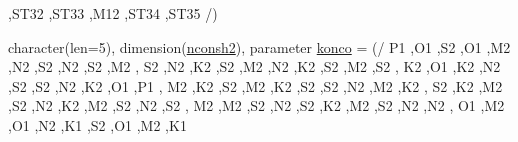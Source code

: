 \begin{DoxyCompactItemize}
\textquotesingle{},\textquotesingle{}\+S\+T32 \textquotesingle{},\textquotesingle{}\+S\+T33 \textquotesingle{},\textquotesingle{}\+M12 \textquotesingle{},\textquotesingle{}\+S\+T34 \textquotesingle{},\textquotesingle{}\+S\+T35 \textquotesingle{}/)
\item 
character(len=5), dimension(\mbox{\hyperlink{namespacemoduletoga_a839ff93f37eef8183b7f13edc4952154}{nconsh2}}), parameter \mbox{\hyperlink{namespacemoduletoga_aa6e7e4054f2ee5447ea73ce7fa1c250a}{konco}} = (/ \textquotesingle{}P1 \textquotesingle{},\textquotesingle{}O1 \textquotesingle{},\textquotesingle{}S2 \textquotesingle{},\textquotesingle{}O1 \textquotesingle{},\textquotesingle{}M2 \textquotesingle{},\textquotesingle{}N2 \textquotesingle{},\textquotesingle{}S2 \textquotesingle{},\textquotesingle{}N2 \textquotesingle{},\textquotesingle{}S2 \textquotesingle{},\textquotesingle{}M2 \textquotesingle{}, \textquotesingle{}S2 \textquotesingle{},\textquotesingle{}N2 \textquotesingle{},\textquotesingle{}K2 \textquotesingle{},\textquotesingle{}S2 \textquotesingle{},\textquotesingle{}M2 \textquotesingle{},\textquotesingle{}N2 \textquotesingle{},\textquotesingle{}K2 \textquotesingle{},\textquotesingle{}S2 \textquotesingle{},\textquotesingle{}M2 \textquotesingle{},\textquotesingle{}S2 \textquotesingle{}, \textquotesingle{}K2 \textquotesingle{},\textquotesingle{}O1 \textquotesingle{},\textquotesingle{}K2 \textquotesingle{},\textquotesingle{}N2 \textquotesingle{},\textquotesingle{}S2 \textquotesingle{},\textquotesingle{}S2 \textquotesingle{},\textquotesingle{}N2 \textquotesingle{},\textquotesingle{}K2 \textquotesingle{},\textquotesingle{}O1 \textquotesingle{},\textquotesingle{}P1 \textquotesingle{}, \textquotesingle{}M2 \textquotesingle{},\textquotesingle{}K2 \textquotesingle{},\textquotesingle{}S2 \textquotesingle{},\textquotesingle{}M2 \textquotesingle{},\textquotesingle{}K2 \textquotesingle{},\textquotesingle{}S2 \textquotesingle{},\textquotesingle{}S2 \textquotesingle{},\textquotesingle{}N2 \textquotesingle{},\textquotesingle{}M2 \textquotesingle{},\textquotesingle{}K2 \textquotesingle{}, \textquotesingle{}S2 \textquotesingle{},\textquotesingle{}K2 \textquotesingle{},\textquotesingle{}M2 \textquotesingle{},\textquotesingle{}S2 \textquotesingle{},\textquotesingle{}N2 \textquotesingle{},\textquotesingle{}K2 \textquotesingle{},\textquotesingle{}M2 \textquotesingle{},\textquotesingle{}S2 \textquotesingle{},\textquotesingle{}N2 \textquotesingle{},\textquotesingle{}S2 \textquotesingle{}, \textquotesingle{}M2 \textquotesingle{},\textquotesingle{}M2 \textquotesingle{},\textquotesingle{}S2 \textquotesingle{},\textquotesingle{}N2 \textquotesingle{},\textquotesingle{}S2 \textquotesingle{},\textquotesingle{}K2 \textquotesingle{},\textquotesingle{}M2 \textquotesingle{},\textquotesingle{}S2 \textquotesingle{},\textquotesingle{}N2 \textquotesingle{},\textquotesingle{}N2 \textquotesingle{}, \textquotesingle{}O1 \textquotesingle{},\textquotesingle{}M2 \textquotesingle{},\textquotesingle{}O1 \textquotesingle{},\textquotesingle{}N2 \textquotesingle{},\textquotesingle{}K1 \textquotesingle{},\textquotesingle{}S2 \textquotesingle{},\textquotesingle{}O1 \textquotesingle{},\textquotesingle{}M2 \textquotesingle{},\textquotesingle{}K1 
\end{DoxyCompactItemize}
